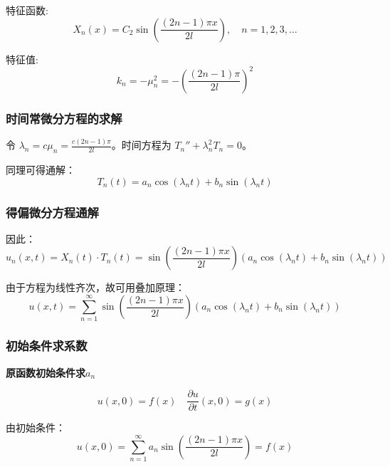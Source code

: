 \documentclass[12pt,a4paper]{article}
\numberwithin{subsection}{section}   %
\numberwithin{subsubsection}{subsection}
\theoremstyle{plain}
\theoremstyle{definition}
\theoremstyle{remark}
\theoremstyle{remark}
\begin{document}
	特征函数:
	\begin{equation}
		X_n(x) = C_2 \sin\left(\frac{(2n-1)\pi x}{2l}\right), \quad n = 1, 2, 3, \ldots
	\end{equation}
	
	特征值:
	\begin{equation}
		k_n = -\mu_n^2 = -\left(\frac{(2n-1)\pi}{2l}\right)^2
	\end{equation}
	
	\subsubsection{时间常微分方程的求解}
	令 $\lambda_n = c \mu_n = \frac{c(2n-1)\pi}{2l}$。时间方程为 $T_n'' + \lambda_n^2 T_n = 0$。
	
	同理可得通解：
	\begin{equation}
		T_n(t) = a_n \cos(\lambda_n t) + b_n \sin(\lambda_n t)
	\end{equation}
	
	\subsubsection{得偏微分方程通解}
	因此：
	\begin{equation}
		u_n(x, t) = X_n(t) \cdot T_n(t) = \sin\left(\frac{(2n-1)\pi x}{2l}\right) \left( a_n \cos(\lambda_n t) + b_n \sin(\lambda_n t) \right)
	\end{equation}
	
	由于方程为线性齐次，故可用叠加原理：
	\begin{equation}
		u(x, t) = \sum_{n=1}^{\infty} \sin\left(\frac{(2n-1)\pi x}{2l}\right) \left( a_n \cos(\lambda_n t) + b_n \sin(\lambda_n t) \right)
	\end{equation}
	
	\subsubsection{初始条件求系数}
	\noindent
	\textbf{原函数初始条件求$a_n$}
	
	\begin{equation}
		u(x, 0) = f(x) \quad \frac{\partial u}{\partial t}(x, 0) = g(x)
	\end{equation}
	
	由初始条件：
	\begin{equation}
		u(x, 0) = \sum_{n=1}^{\infty} a_n \sin\left(\frac{(2n-1)\pi x}{2l}\right) = f(x)
	\end{equation}
	
\end{document}
